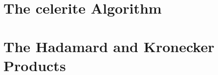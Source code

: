 \documentclass[preprint2]{aastex62}
\newcommand{\project}[1]{\textsf{#1}}
\newcommand{\celerite}{\project{celerite }}
\begin{document}
\acknowledgments

%






\appendix
\section{The \celerite Algorithm}
\label{sec:celerite_algorithm}
\section{The Hadamard and Kronecker Products}
\label{sec:matrix_prod}
\end{document}

